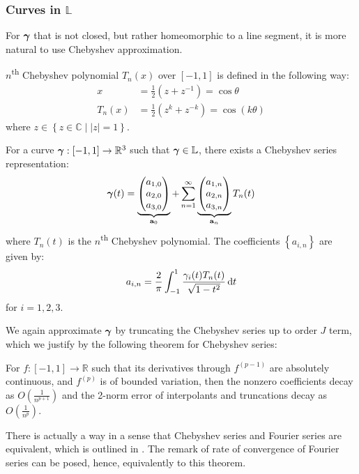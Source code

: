 \documentclass[../dissertation.tex]{subfiles}
\begin{document}
\subsubsection{Curves in $\mathbb{L}$}
For $\boldsymbol{\gamma}$ that is not closed, but rather homeomorphic to a line segment,
it is more natural to use Chebyshev approximation\cite{Trefethen_2020}.
\begin{definition}
    $n$\textsuperscript{th} Chebyshev polynomial $T_n(x)$ over $\left[ -1,1 \right]$ is defined in the following way:
    \begin{align}
        x &= \frac{1}{2} \left( z+z^{-1} \right) = \cos{\theta} \\
        T_n(x) &= \frac{1}{2}\left( z^k + z^{-k} \right) = \cos{(k\theta)}
    \end{align}
    where $z \in \left\{ z\in\mathbb{C} \middle| |z| = 1 \right\}$.
\end{definition}
For a curve $\boldsymbol{\gamma}:\left[ -1, 1 \right] \rightarrow \mathbb{R}^3$ such that $\boldsymbol{\gamma} \in \mathbb{L}$,
there exists a Chebyshev series representation:
\begin{equation}
    \boldsymbol{\gamma} (t) =
    \underbrace{
    \begin{pmatrix}
        a_{1,0} \\
        a_{2,0} \\
        a_{3,0}
    \end{pmatrix}
}_{\mathbf{a}_0}
    +
    \sum_{n=1}^{\infty}
    \underbrace{
    \begin{pmatrix}
        a_{1,n} \\
        a_{2,n} \\
        a_{3,n}
    \end{pmatrix}
}_{\mathbf{a}_n}
    T_n (t)
\end{equation}
where $T_n (t)$ is the $n$\textsuperscript{th} Chebyshev polynomial.
The coefficients $\left\{ a_{i,n} \right\}$ are given by:
\begin{equation}
    a_{i,n} = \frac{2}{\pi} \int_{-1}^{1} \frac{\gamma_i(t) T_n(t)}{\sqrt{1-t^2}} \, \text{d} t
\end{equation}
for $i = 1, 2, 3$.

We again approximate $\boldsymbol{\gamma}$ by truncating the Chebyshev series up to order $J$ term,
which we justify by the following theorem for Chebyshev series:
\begin{theorem}
    \label{thrm: Rate of Convergence of Chebyshev Series}
    For $f:\left[ -1,1 \right]\rightarrow \mathbb{R}$ such that its derivatives through $f^{(p-1)}$ are absolutely continuous, and $f^{(p)}$ is of bounded variation, then the nonzero coefficients decay as $O\left( \frac{1}{n^{p+1}} \right)$ and the 2-norm error of interpolants and truncations decay as $O\left( \frac{1}{n^p} \right)$.
\end{theorem}
\begin{remark}
    There is actually a way in a sense that Chebyshev series and Fourier series are equivalent, which is outlined in \cite{Trefethen_2020}.
    The remark of rate of convergence of Fourier series can be posed, hence, equivalently to this theorem.
\end{remark}
\end{document}
